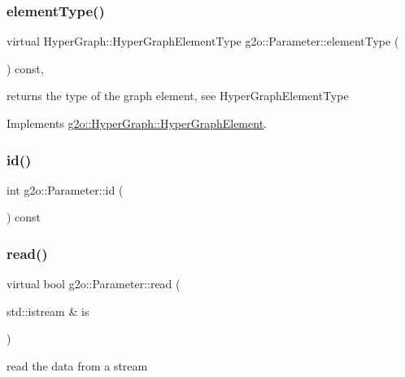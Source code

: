 \subsubsection{\texorpdfstring{element\+Type()}{elementType()}}
{\footnotesize\ttfamily virtual Hyper\+Graph\+::\+Hyper\+Graph\+Element\+Type g2o\+::\+Parameter\+::element\+Type (\begin{DoxyParamCaption}{ }\end{DoxyParamCaption}) const\hspace{0.3cm}{\ttfamily [inline]}, {\ttfamily [virtual]}}

returns the type of the graph element, see Hyper\+Graph\+Element\+Type 

Implements \mbox{\hyperlink{structg2o_1_1_hyper_graph_1_1_hyper_graph_element_a1a9d7b748698c09d202373e06e413ef2}{g2o\+::\+Hyper\+Graph\+::\+Hyper\+Graph\+Element}}.

\mbox{\label{classg2o_1_1_parameter_a1bca491a08b68a7a6b85204a5a8b0f2c}} 
\subsubsection{\texorpdfstring{id()}{id()}}
{\footnotesize\ttfamily int g2o\+::\+Parameter\+::id (\begin{DoxyParamCaption}{ }\end{DoxyParamCaption}) const\hspace{0.3cm}{\ttfamily [inline]}}

\mbox{\label{classg2o_1_1_parameter_a77d9d88d8bde52198631fcd0fc4c9d0e}} 
\subsubsection{\texorpdfstring{read()}{read()}}
{\footnotesize\ttfamily virtual bool g2o\+::\+Parameter\+::read (\begin{DoxyParamCaption}\item[{std\+::istream \&}]{is }\end{DoxyParamCaption})\hspace{0.3cm}{\ttfamily [pure virtual]}}



read the data from a stream 

